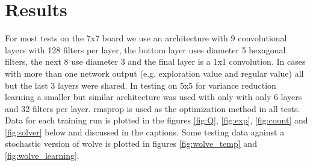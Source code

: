 \documentclass{article}
\begin{document}
\section*{Results}
For most tests on the 7x7 board we use an architecture with 9 convolutional layers with 128 filters per layer, the bottom layer uses diameter 5 hexagonal filters, the next 8 use diameter 3 and the final layer is a 1x1 convolution. In cases with more than one network output (e.g. exploration value and regular value) all but the last 3 layers were shared. In testing on 5x5 for variance reduction learning a smaller but similar architecture was used with only with only 6 layers and 32 filters per layer. rmsprop is used as the optimization method in all tests. Data for each training run is plotted in the figures \ref{fig:Q}, \ref{fig:exp}, \ref{fig:count} and \ref{fig:solver} below and discussed in the captions. Some testing data against a stochastic version of wolve is plotted in figures \ref{fig:wolve_temp} and \ref{fig:wolve_learning}.
\end{document}
